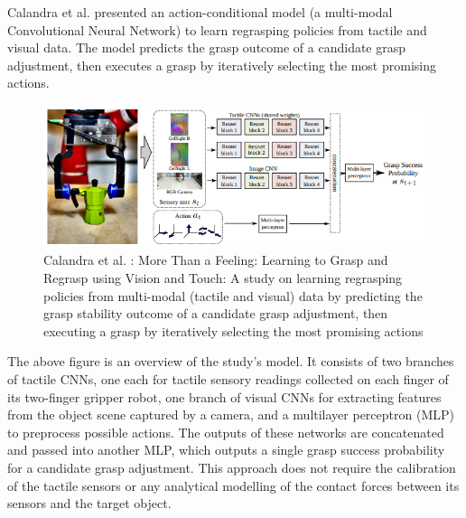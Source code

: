 \documentclass[11pt, a4paper]{report}
\begin{document}
Calandra et al. \cite{Calandra_2018} presented an action-conditional model (a multi-modal Convolutional Neural Network) to learn regrasping policies from tactile and visual data. The model predicts the grasp outcome of a candidate grasp adjustment, then executes a grasp by iteratively selecting the most promising actions.
\begin{figure}[H]
    \centering
    \includegraphics[width=\textwidth]{docs/Project Report/Media/1_1_calandra_2018_model.png}
    \caption{Calandra et al. \cite{Calandra_2018}: More Than a Feeling: Learning to Grasp and Regrasp using Vision and Touch: A study on learning regrasping policies from multi-modal (tactile and visual) data by predicting the grasp stability outcome of a candidate grasp adjustment, then executing a grasp by iteratively selecting the most promising actions}
    \label{fig:2.6}
\end{figure}
The above figure is an overview of the study's model. It consists of two branches of tactile CNNs, one each for tactile sensory readings collected on each finger of its two-finger gripper robot, one branch of visual CNNs for extracting features from the object scene captured by a camera, and a multilayer perceptron (MLP) to preprocess possible actions. The outputs of these networks are concatenated and passed into another MLP, which outputs a single grasp success probability for a candidate grasp adjustment. This approach does not require the calibration of the tactile sensors or any analytical modelling of the contact forces between its sensors and the target object.\\
\end{document}
